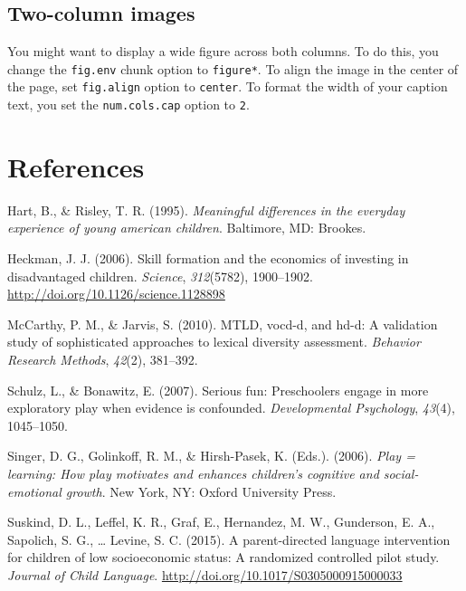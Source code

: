 \documentclass[10pt, letterpaper]{article}
\begin{document}
\subsection{Two-column images}\label{two-column-images}

You might want to display a wide figure across both columns. To do this,
you change the \texttt{fig.env} chunk option to \texttt{figure*}. To
align the image in the center of the page, set \texttt{fig.align} option
to \texttt{center}. To format the width of your caption text, you set
the \texttt{num.cols.cap} option to \texttt{2}.

\section{References}\label{references}

\setlength{\parindent}{-0.1in} \setlength{\leftskip}{0.125in} \noindent

\hypertarget{refs}{}
\hypertarget{ref-Hart1995}{}
Hart, B., \& Risley, T. R. (1995). \emph{Meaningful differences in the
everyday experience of young american children}. Baltimore, MD: Brookes.

\hypertarget{ref-Heckman2006}{}
Heckman, J. J. (2006). Skill formation and the economics of investing in
disadvantaged children. \emph{Science}, \emph{312}(5782), 1900--1902.
\url{http://doi.org/10.1126/science.1128898}

\hypertarget{ref-McCarthy2010}{}
McCarthy, P. M., \& Jarvis, S. (2010). MTLD, vocd-d, and hd-d: A
validation study of sophisticated approaches to lexical diversity
assessment. \emph{Behavior Research Methods}, \emph{42}(2), 381--392.

\hypertarget{ref-Schulz2007}{}
Schulz, L., \& Bonawitz, E. (2007). Serious fun: Preschoolers engage in
more exploratory play when evidence is confounded. \emph{Developmental
Psychology}, \emph{43}(4), 1045--1050.

\hypertarget{ref-Singer2006}{}
Singer, D. G., Golinkoff, R. M., \& Hirsh-Pasek, K. (Eds.). (2006).
\emph{Play = learning: How play motivates and enhances children's
cognitive and social-emotional growth}. New York, NY: Oxford University
Press.

\hypertarget{ref-Suskind2015}{}
Suskind, D. L., Leffel, K. R., Graf, E., Hernandez, M. W., Gunderson, E.
A., Sapolich, S. G., \ldots{} Levine, S. C. (2015). A parent-directed
language intervention for children of low socioeconomic status: A
randomized controlled pilot study. \emph{Journal of Child Language}.
\url{http://doi.org/10.1017/S0305000915000033}


\end{document}

